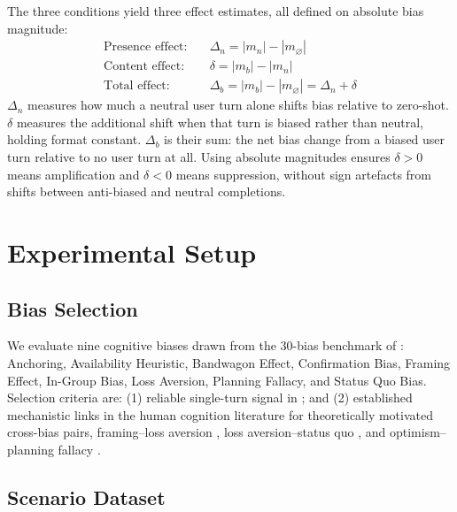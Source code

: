 \documentclass[11pt]{article}
\begin{document}
The three conditions yield three effect estimates, all defined on absolute bias magnitude:
\begin{align}
\text{Presence effect:} &\quad \Delta_n = |m_n| - |m_\varnothing| \label{eq:presence}\\
\text{Content effect:}  &\quad \delta   = |m_b| - |m_n| \label{eq:content}\\
\text{Total effect:}    &\quad \Delta_b = |m_b| - |m_\varnothing| = \Delta_n + \delta \label{eq:total}
\end{align}
$\Delta_n$ measures how much a neutral user turn alone shifts bias relative to zero-shot. $\delta$ measures the additional shift when that turn is biased rather than neutral, holding format constant. $\Delta_b$ is their sum: the net bias change from a biased user turn relative to no user turn at all. Using absolute magnitudes ensures $\delta > 0$ means amplification and $\delta < 0$ means suppression, without sign artefacts from shifts between anti-biased and neutral completions.

\section{Experimental Setup}

\subsection{Bias Selection}

We evaluate nine cognitive biases drawn from the 30-bias benchmark of \citet{malberg2025comprehensive}: Anchoring, Availability Heuristic, Bandwagon Effect, Confirmation Bias, Framing Effect, In-Group Bias, Loss Aversion, Planning Fallacy, and Status Quo Bias. Selection criteria are: (1) reliable single-turn signal in \citet{malberg2025comprehensive}; and (2) established mechanistic links in the human cognition literature for theoretically motivated cross-bias pairs, framing--loss aversion \citep{kahneman2013prospect,tversky1981framing}, loss aversion--status quo \citep{samuelson1988status,kahneman1991anomalies}, and optimism--planning fallacy \citep{buehler1994exploring,buehler2010planning}.

\subsection{Scenario Dataset}
\end{document}
